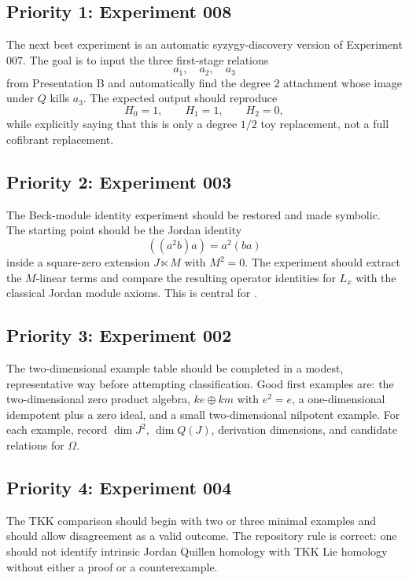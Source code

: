 \documentclass[11pt]{report}
\theoremstyle{definition}
\theoremstyle{plain}
\begin{document}
\subsection*{Priority 1: Experiment 008}

The next best experiment is an automatic syzygy-discovery version of
Experiment 007. The goal is to input the three first-stage relations
\[
  a_1,\quad a_2,\quad a_3
\]
from Presentation B and automatically find the degree \(2\) attachment whose
image under \(Q\) kills \(a_3\). The expected output should reproduce
\[
  H_0=1,\qquad H_1=1,\qquad H_2=0,
\]
while explicitly saying that this is only a degree \(1/2\) toy replacement, not
a full cofibrant replacement.

\subsection*{Priority 2: Experiment 003}

The Beck-module identity experiment should be restored and made symbolic. The
starting point should be the Jordan identity
\[
  ((a^2b)a)=a^2(ba)
\]
inside a square-zero extension \(J\ltimes M\) with \(M^2=0\). The experiment
should extract the \(M\)-linear terms and compare the resulting operator
identities for \(L_x\) with the classical Jordan module axioms. This is central
for .

\subsection*{Priority 3: Experiment 002}

The two-dimensional example table should be completed in a modest,
representative way before attempting classification. Good first examples are:
the two-dimensional zero product algebra, \(ke\oplus km\) with \(e^2=e\), a
one-dimensional idempotent plus a zero ideal, and a small two-dimensional
nilpotent example. For each example, record \(\dim J^2\), \(\dim Q(J)\),
derivation dimensions, and candidate relations for \(\Omega\).

\subsection*{Priority 4: Experiment 004}

The TKK comparison should begin with two or three minimal examples and should
allow disagreement as a valid outcome. The repository rule is correct: one
should not identify intrinsic Jordan Quillen homology with TKK Lie homology
without either a proof or a counterexample.
\end{document}
